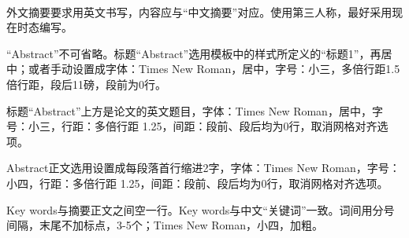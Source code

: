  \setlength{\baselineskip}{20pt}
\begin{englishabstract}

	\centerline{}\par
	~\par

	外文摘要要求用英文书写，内容应与“中文摘要”对应。使用第三人称，最好采用现在时态编写。\par
	“Abstract”不可省略。标题“Abstract”选用模板中的样式所定义的“标题1”，再居中；或者手动设置成字体：Times New Roman，居中，字号：小三，多倍行距1.5倍行距，段后11磅，段前为0行。\par
	标题“Abstract”上方是论文的英文题目，字体：Times New Roman，居中，字号：小三，行距：多倍行距 1.25，间距：段前、段后均为0行，取消网格对齐选项。\par
	Abstract正文选用设置成每段落首行缩进2字，字体：Times New Roman，字号：小四，行距：多倍行距 1.25，间距：段前、段后均为0行，取消网格对齐选项。\par
	Key words与摘要正文之间空一行。Key words与中文“关键词”一致。词间用分号间隔，末尾不加标点，3-5个；Times New Roman，小四，加粗。\par
	
	~\par
	\noindent{}

\end{englishabstract}